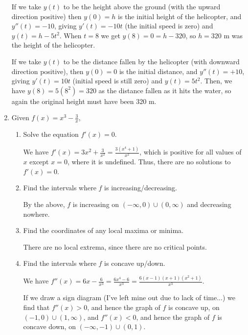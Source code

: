 \documentclass[12pt]{article}
\newcommand{\di}{\displaystyle}
\begin{document}
\begin{enumerate}
If we take $y(t)$ to be the height above the ground (with the upward direction positive) then $y(0)=h$ is the initial height of the helicopter, and $y''(t)=-10$, giving $y'(t)=-10t$ (the initial speed is zero) and $y(t)=h-5t^2$. When $t=8$ we get $y(8)=0=h-320$, so $h=320$ m was the height of the helicopter.

If we take $y(t)$ to be the distance fallen by the helicopter (with downward direction positive), then $y(0)=0$ is the initial distance, and $y''(t) = +10$, giving $y'(t)=10t$ (initial speed is still zero) and $y(t)=5t^2$. Then, we have $y(8)=5(8^2)=320$ as the distance fallen as it hits the water, so again the original height must have been $320$ m.
\newpage


\item Given $\di f(x) = x^3-\frac{3}{x}$,
\begin{enumerate}
\item Solve the equation $f'(x)=0$.

We have $f'(x) = 3x^2+\frac{3}{x^2} = \frac{3(x^4+1)}{x^2}$, which is positive for all values of $x$ except $x=0$, where it is undefined. Thus, there are no solutions to $f'(x)=0$.

\item Find the intervals where $f$ is increasing/decreasing.

By the above, $f$ is increasing on $(-\infty, 0)\cup(0,\infty)$ and decreasing nowhere.

\item Find the coordinates of any local maxima or minima.

There are no local extrema, since there are no critical points.


\item Find the intervals where $f$ is concave up/down.

We have $f''(x) = 6x-\frac{6}{x^3}=\frac{6x^4-6}{x^3}=\frac{6(x-1)(x+1)(x^2+1)}{x^3}$.

If we draw a sign diagram (I've left mine out due to lack of time...) we find that $f''(x)>0$, and hence the graph of $f$ is concave up, on $(-1,0)\cup (1,\infty)$, and $f''(x)<0$, and hence the graph of $f$ is concave down, on $(-\infty, -1)\cup (0,1)$.

\end{enumerate}
\end{enumerate}
\end{document}
